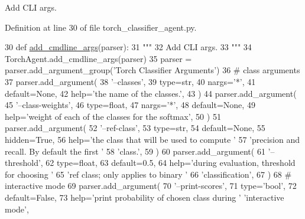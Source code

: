 \begin{DoxyVerb}Add CLI args.
\end{DoxyVerb}
 

Definition at line 30 of file torch\+\_\+classifier\+\_\+agent.\+py.


\begin{DoxyCode}
30     \textcolor{keyword}{def }\hyperlink{namespaceparlai_1_1agents_1_1drqa_1_1config_a62fdd5554f1da6be0cba185271058320}{add\_cmdline\_args}(parser):
31         \textcolor{stringliteral}{"""}
32 \textcolor{stringliteral}{        Add CLI args.}
33 \textcolor{stringliteral}{        """}
34         TorchAgent.add\_cmdline\_args(parser)
35         parser = parser.add\_argument\_group(\textcolor{stringliteral}{'Torch Classifier Arguments'})
36         \textcolor{comment}{# class arguments}
37         parser.add\_argument(
38             \textcolor{stringliteral}{'--classes'},
39             type=str,
40             nargs=\textcolor{stringliteral}{'*'},
41             default=\textcolor{keywordtype}{None},
42             help=\textcolor{stringliteral}{'the name of the classes.'},
43         )
44         parser.add\_argument(
45             \textcolor{stringliteral}{'--class-weights'},
46             type=float,
47             nargs=\textcolor{stringliteral}{'*'},
48             default=\textcolor{keywordtype}{None},
49             help=\textcolor{stringliteral}{'weight of each of the classes for the softmax'},
50         )
51         parser.add\_argument(
52             \textcolor{stringliteral}{'--ref-class'},
53             type=str,
54             default=\textcolor{keywordtype}{None},
55             hidden=\textcolor{keyword}{True},
56             help=\textcolor{stringliteral}{'the class that will be used to compute '}
57             \textcolor{stringliteral}{'precision and recall. By default the first '}
58             \textcolor{stringliteral}{'class.'},
59         )
60         parser.add\_argument(
61             \textcolor{stringliteral}{'--threshold'},
62             type=float,
63             default=0.5,
64             help=\textcolor{stringliteral}{'during evaluation, threshold for choosing '}
65             \textcolor{stringliteral}{'ref class; only applies to binary '}
66             \textcolor{stringliteral}{'classification'},
67         )
68         \textcolor{comment}{# interactive mode}
69         parser.add\_argument(
70             \textcolor{stringliteral}{'--print-scores'},
71             type=\textcolor{stringliteral}{'bool'},
72             default=\textcolor{keyword}{False},
73             help=\textcolor{stringliteral}{'print probability of chosen class during '} \textcolor{stringliteral}{'interactive mode'},

\end{DoxyCode}
